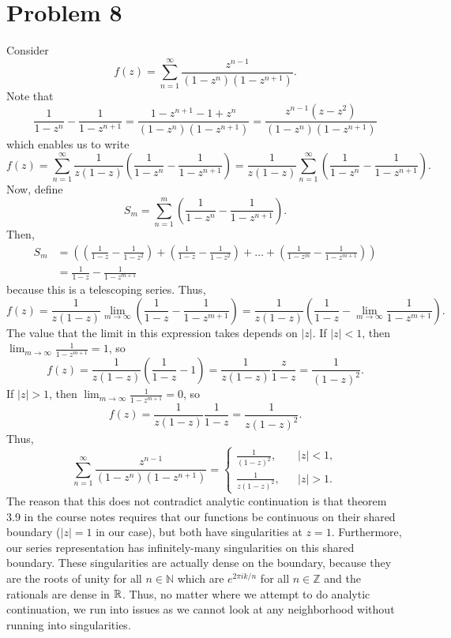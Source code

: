 \documentclass{article}
\begin{document}
\section{Problem 8} 
Consider
\[
f(z)=\sum_{n=1}^\infty \frac{z^{n-1}}{(1-z^n)(1-z^{n+1})}.
\]
Note that 
\[
\frac{1}{1-z^n}-\frac{1}{1-z^{n+1}}=\frac{1-z^{n+1}-1+z^n}{(1-z^n)(1-z^{n+1})}=\frac{z^{n-1}(z-z^2)}{(1-z^n)(1-z^{n+1})}
\]
which enables us to write 
\[
f(z)=\sum_{n=1}^\infty\frac{1}{z(1-z)}\left(\frac{1}{1-z^n}-\frac{1}{1-z^{n+1}}\right)=\frac{1}{z(1-z)}\sum_{n=1}^\infty\left(\frac{1}{1-z^n}-\frac{1}{1-z^{n+1}}\right).
\]
Now, define
\[
S_m=\sum_{n=1}^m\left(\frac{1}{1-z^n}-\frac{1}{1-z^{n+1}}\right).
\]
Then, 
\begin{align*}
S_m&=\left(\left(\frac{1}{1-z}-\frac{1}{1-z^2}\right)+\left(\frac{1}{1-z}-\frac{1}{1-z^2}\right)+\ldots+\left(\frac{1}{1-z^m}-\frac{1}{1-z^{m+1}}\right)\right)\\&=
\frac{1}{1-z}-\frac{1}{1-z^{m+1}}
\end{align*}
because this is a telescoping series. Thus,
\[
f(z)=\frac{1}{z(1-z)}\lim_{m\to\infty}\left(\frac{1}{1-z}-\frac{1}{1-z^{m+1}}\right)=\frac{1}{z(1-z)}\left(\frac{1}{1-z}-\lim_{m\to\infty}\frac{1}{1-z^{m+1}}\right).
\]
The value that the limit in this expression takes depends on $|z|$. If $|z|<1$, then $\lim_{m\to\infty}\frac{1}{1-z^{m+1}}=1$, so 
\[
f(z)=\frac{1}{z(1-z)}\left(\frac{1}{1-z}-1\right)=\frac{1}{z(1-z)}\frac{z}{1-z}=\frac{1}{(1-z)^2}.
\]
If $|z|>1$, then $\lim_{m\to\infty}\frac{1}{1-z^{m+1}}=0$, so 
\[
f(z)=\frac{1}{z(1-z)}\frac{1}{1-z}=\frac{1}{z(1-z)^2}.
\] 
Thus, 
\[
		\sum_{n=1}^\infty \frac{z^{n-1}}{(1-z^n)(1-z^{n+1})}=\left\{
		\begin{array}{lcr}
			\frac{1}{(1-z)^2},  &  & |z|<1, \\
			\frac{1}{z(1-z)^2}, &  & |z|>1.
		\end{array}
		\right.
\]
The reason that this does not contradict analytic continuation is that theorem 3.9 in the course notes requires that our functions be continuous on their shared boundary ($|z|=1$ in our case), but both have singularities at $z=1$. Furthermore, our series representation has infinitely-many singularities on this shared boundary. These singularities are actually dense on the boundary, because they are the roots of unity for all $n\in\mathbb{N}$ which are $e^{2\pi i k/n}$ for all $n\in\mathbb{Z}$ and the rationals are dense in $\mathbb{R}$. Thus, no matter where we attempt to do analytic continuation, we run into issues as we cannot look at any neighborhood without running into singularities. 
\end{document}
